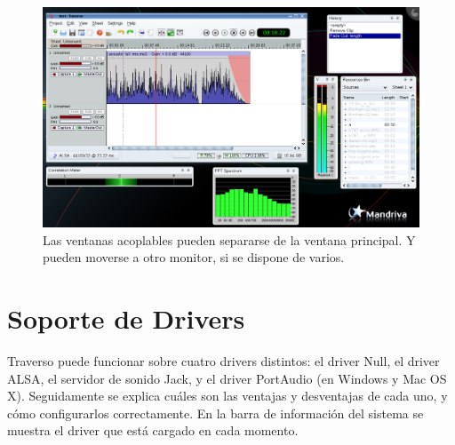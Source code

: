 \begin{figure}
 \centering\includegraphics[width=\textwidth]{../images/sshot03.png}
 \caption{Las ventanas acoplables pueden separarse de la ventana principal. Y pueden moverse a otro monitor, si se dispone de varios.}
 \label{fig_mainwin02}
\end{figure}

\section{Soporte de Drivers}
Traverso puede funcionar sobre cuatro drivers distintos: el driver Null, el driver ALSA, el servidor de sonido Jack, y el driver PortAudio (en Windows y Mac OS X). Seguidamente se explica cuáles son las ventajas y desventajas de cada uno, y cómo configurarlos correctamente. En la barra de información del sistema se muestra el driver que está cargado en cada momento.

